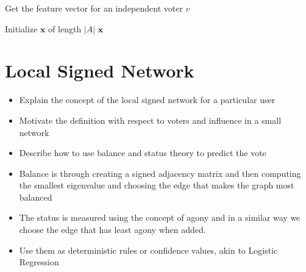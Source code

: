 \begin{algorithm}[H]
    \caption{Get the feature vector for an independent voter $v$ }
    Initialize $\mathbf{x}$ of length $|A|$\;
    \Return $\mathbf{x}$
   \end{algorithm}
   
\section{Local Signed Network}
\label{sec:local-signed-network}
\begin{itemize}
    \item Explain the concept of the local signed network for a particular user
    \item Motivate the definition with respect to voters and influence in a small network
    \item Describe how to use balance and status theory to predict the vote
    \item Balance is through creating a signed adjacency matrix and then computing the smallest eigenvalue and choosing the edge that makes the graph most balanced
    \item The status is measured using the concept of agony and in a similar way we choose the edge that has least agony when added.
    \item Use them as deterministic rules or confidence values, akin to Logistic Regression
\end{itemize}
